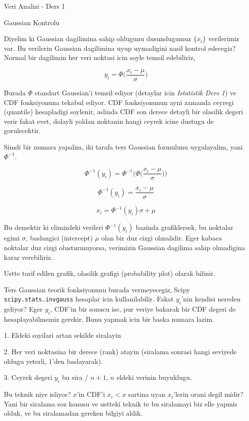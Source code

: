 \documentclass[12pt,fleqn]{article}\usepackage{../common}
\begin{document}
Veri Analizi - Ders 1

Gaussian Kontrolu

Diyelim ki Gaussian dagilimina sahip oldugunu dusundugumuz $\{ x_i\}$
verilerimiz var. Bu verilerin Gaussian dagilimina uyup uymadigini nasil
kontrol edecegiz? Normal bir dagilimin her veri noktasi icin soyle temsil
edebiliriz,

\[ y_i = \Phi\bigg(\frac{ x_i - \mu}{\sigma}\bigg) \]

Burada $\Phi$ standart Gaussian'i temsil ediyor (detaylar icin {\em
  Istatistik Ders 1}) ve CDF fonksiyonuna tekabul ediyor. CDF fonksiyonunun
ayni zamanda ceyregi (quantile) hesapladigi soylenir, aslinda CDF son
derece detayli bir olasilik degeri verir fakat evet, dolayli yoldan
noktanin hangi ceyrek icine dustugu de gorulecektir.

Simdi bir numara yapalim, iki tarafa ters Gaussian formulunu uygulayalim,
yani $\Phi ^{-1} $.

\[ \Phi ^{-1}(y_i) = \Phi ^{-1}\bigg(\Phi\bigg(\frac{ x_i - \mu}{\sigma}\bigg)\bigg) \]

\[ \Phi ^{-1}(y_i) = \frac{ x_i - \mu}{\sigma}\]

\[  x_i = \Phi^{-1}(y_i) \sigma + \mu  \]

Bu demektir ki elimizdeki verileri $\Phi^{-1}(y_i)$ bazinda grafiklersek,
bu noktalar egimi $\sigma$, baslangici (intercept) $\mu$ olan bir duz cizgi
olmalidir. Eger kabaca noktalar duz cizgi olusturmuyorsa, verimizin 
Gaussian dagilima sahip olmadigina karar verebiliriz. 

Ustte tarif edilen grafik,  olasilik grafigi (probability plot) olarak
bilinir. 

Ters Gaussian teorik fonksiyonunu burada vermeyecegiz, Scipy
\verb!scipy.stats.invgauss! hesaplar icin kullanilabilir. Fakat $y_i$'nin
kendisi nereden geliyor? Eger $y_i$, CDF'in bir sonucu ise, pur veriye
bakarak bir CDF degeri de hesaplayabilmemiz gerekir. Bunu yapmak icin bir
baska numara lazim. 

1. Eldeki sayilari artan sekilde siralayin

2. Her veri noktasina bir derece (rank) atayin (siralama sonrasi hangi
seviyede oldugu yeterli, 1'den baslayarak). 

3. Ceyrek degeri $y_i$ bu sira / $n+1$, $n$ eldeki verinin buyuklugu. 

Bu teknik niye isliyor? $x$'in CDF'i $x_i < x$ sartina uyan $x_i$'lerin
orani degil midir? Yani bir siralama soz konusu ve ustteki teknik te bu
siralamayi biz elle yapmis olduk, ve bu siralamadan gereken bilgiyi aldik. 
\end{document}
